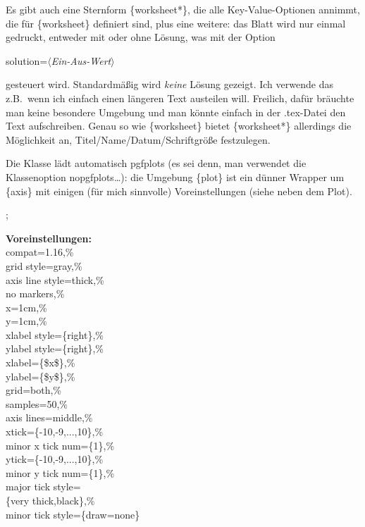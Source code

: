 \documentclass[hyperworksheet]{drcschool}
\newcommand*{\pkg}[1]{\textup{\ttfamily#1}}                                %
\newcommand*{\opt}[1]{\textup{\ttfamily#1}}                                %
\newcommand*{\env}[1]{\textup{\ttfamily\{#1\}}}                            %
\newcommand*{\param}[1]{\mbox{\normalfont$\langle$\textit{#1}$\rangle$}}   %
\begin{document}
\begin{worksheet}[Verschiedenes]
Es gibt auch eine Sternform \env{worksheet*}, die alle Key-Value-Optionen
annimmt, die für \env{worksheet} definiert sind, plus eine weitere: das Blatt
wird nur einmal gedruckt, entweder mit oder ohne Lösung, was mit der Option
\begin{compactdesc}
\item[\opt{solution=\param{Ein-Aus-Wert}}]
\end{compactdesc}
gesteuert wird. Standardmäßig wird \emph{keine} Lösung gezeigt.
Ich verwende das z.B.~wenn ich einfach einen längeren Text austeilen will.
Freilich, dafür bräuchte man keine besondere Umgebung und man könnte einfach in
der \opt{.tex}-Datei den Text aufschreiben. Genau so wie \env{worksheet} bietet
\env{worksheet*} allerdings die Möglichkeit an, Titel/Name/Datum/Schriftgröße
festzulegen.

\exercise[Plots]
Die Klasse lädt automatisch \pkg{pgfplots} (es sei denn, man verwendet die
Klassenoption \opt{nopgfplots}\ldots): die Umgebung \env{plot} ist
ein dünner Wrapper um \env{axis} mit einigen (für mich sinnvolle) Voreinstellungen
(siehe neben dem Plot).

\noindent
\begin{plot}[xmin=-5,xmax=5,ymin=-3.7,ymax=4.5]
 ;
\end{plot}\hfill
\parbox[b]{.3\linewidth}{%
   \footnotesize
   \textbf{Voreinstellungen:}\\
   \ttfamily
   compat=1.16,\%\\
   grid style=gray,\%\\
   axis line style=thick,\%\\
   no markers,\%\\
   x=1cm,\%\\
   y=1cm,\%\\
   xlabel style=\{right\},\%\\
   ylabel style=\{right\},\%\\
   xlabel=\{\$x\$\},\%\\
   ylabel=\{\$y\$\},\%\\
   grid=both,\%\\
   samples=50,\%\\
   axis lines=middle,\%\\
   xtick=\{-10,-9,...,10\},\%\\
   minor x tick num=\{1\},\%\\
   ytick=\{-10,-9,...,10\},\%\\
   minor y tick num=\{1\},\%\\
   major tick style=\\\null\qquad\{very thick,black\},\%\\
   minor tick style=\{draw=none\}
}


\end{worksheet}
\end{document}
